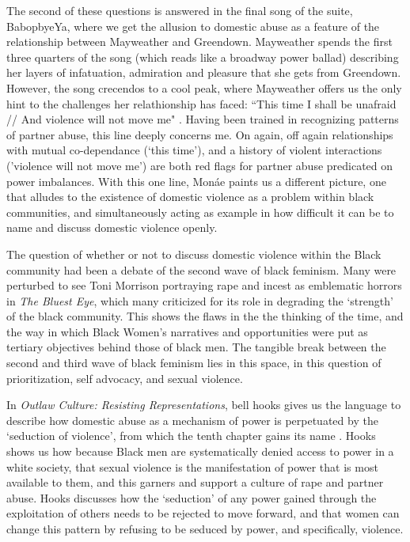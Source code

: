 \documentclass[a4paper, 11pt]{article} %
\begin{document}
The second of these questions is answered in the final song of the suite, BabopbyeYa, where we get the allusion to domestic abuse as a feature of the relationship between Mayweather and Greendown.
Mayweather spends the first three quarters of the song (which reads like a broadway power ballad) describing her layers of infatuation, admiration and pleasure that she gets from Greendown.
However, the song crecendos to a cool peak, where Mayweather offers us the only hint to the challenges her relathionship has faced: ``This time I shall be unafraid // And violence will not move me" \cite{babopbyeya}.
Having been trained in recognizing patterns of partner abuse, this line deeply concerns me.
On again, off again relationships with mutual co-dependance (`this time'), and a history of violent interactions ('violence will not move me') are both red flags for partner abuse predicated on power imbalances.
With this one line, Mon\'ae paints us a different picture, one that alludes to the existence of domestic violence as a problem within black communities, and simultaneously acting as example in how difficult it can be to name and discuss domestic violence openly. 

The question of whether or not to discuss domestic violence within the Black community had been a debate of the second wave of black feminism.
Many were perturbed to see Toni Morrison portraying rape and incest as emblematic horrors in \emph{The Bluest Eye}, which many criticized for its role in degrading the `strength' of the black community.
This shows the flaws in the the thinking of the time, and the way in which Black Women's narratives and opportunities were put as tertiary objectives behind those of black men.
The tangible break between the second and third wave of black feminism lies in this space, in this question of prioritization, self advocacy, and sexual violence.

In \emph{Outlaw Culture: Resisting Representations}, bell hooks gives us the language to describe how domestic abuse as a mechanism of power is perpetuated by the `seduction of violence', from which the tenth chapter gains its name \cite{hooks1994outlaw}.
Hooks shows us how because Black men are systematically denied access to power in a white society, that sexual violence is the manifestation of power that is most available to them, and this garners and support a culture of rape and partner abuse.
Hooks discusses how the `seduction' of any power gained through the exploitation of others needs to be rejected to move forward, and that women can change this pattern by refusing to be seduced by power, and specifically, violence.
\end{document}
